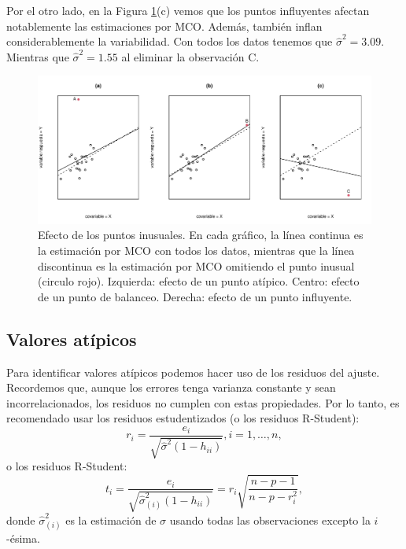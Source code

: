 \documentclass[
]{article}
\begin{document}
Por el otro lado, en la Figura \ref{fig:puntosAIw}(c) vemos que los puntos influyentes afectan notablemente las estimaciones por MCO. Además, también inflan considerablemente la variabilidad. Con todos los datos tenemos que \(\widehat{\sigma}^{2}=3.09\). Mientras que \(\widehat{\sigma}^{2}=1.55\) al eliminar la observación C.

\begin{figure}

{\centering \includegraphics{MLGI_files/figure-latex/puntosAIw-1} 

}

\caption{Efecto de los puntos inusuales. En cada gráfico, la línea continua es la estimación por MCO con todos los datos, mientras que la línea discontinua es la estimación por MCO omitiendo el punto inusual (circulo rojo). Izquierda: efecto de un punto atípico. Centro: efecto de un punto de balanceo. Derecha: efecto de un punto influyente.}\label{fig:puntosAIw}
\end{figure}

\hypertarget{valores-atuxedpicos}{%
\subsection{Valores atípicos}\label{valores-atuxedpicos}}

Para identificar valores atípicos podemos hacer uso de los residuos del ajuste. Recordemos que, aunque los errores tenga varianza constante y sean incorrelacionados, los residuos no cumplen con estas propiedades. Por lo tanto, es recomendado usar los residuos estudentizados (o los residuos R-Student):
\[
r_{i} = \frac{e_{i}}{\sqrt{\widehat{\sigma}^{2}(1-h_{ii})}}, i=1,\ldots,n,
\]
o los residuos R-Student:
\[
t_{i} = \frac{e_{i}}{\sqrt{\widehat{\sigma}^{2}_{(i)}(1-h_{ii})}} = r_{i} \sqrt{\frac{n-p-1}{n-p-r_{i}^{2}}},
\]
donde \(\widehat{\sigma}^{2}_{(i)}\) es la estimación de \(\sigma\) usando todas las observaciones excepto la \(i\)-ésima.
\end{document}
